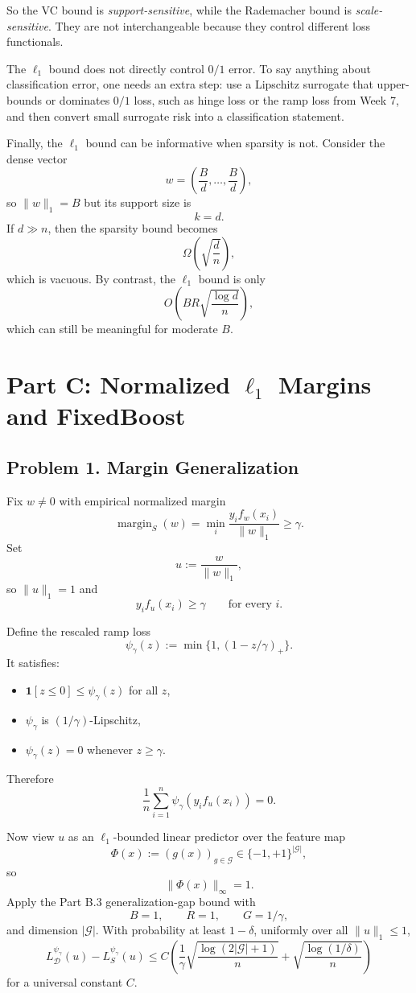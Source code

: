 \documentclass{article}
\newcommand{\cD}{\mathcal{D}}
\newcommand{\cG}{\mathcal{G}}
\newcommand{\one}{\mathbf{1}}
\begin{document}
So the VC bound is \emph{support-sensitive}, while the Rademacher bound is \emph{scale-sensitive}. They are not interchangeable because they control different loss functionals.

The $\ell_1$ bound does not directly control $0/1$ error. To say anything about classification error, one needs an extra step: use a Lipschitz surrogate that upper-bounds or dominates $0/1$ loss, such as hinge loss or the ramp loss from Week 7, and then convert small surrogate risk into a classification statement.

Finally, the $\ell_1$ bound can be informative when sparsity is not. Consider the dense vector
$$
w=\left(\frac{B}{d},\dots,\frac{B}{d}\right),
$$
so $\|w\|_1=B$ but its support size is
$$
k=d.
$$
If $d\gg n$, then the sparsity bound becomes
$$
\Omega\!\left(\sqrt{\frac{d}{n}}\right),
$$
which is vacuous. By contrast, the $\ell_1$ bound is only
$$
O\!\left(
BR\sqrt{\frac{\log d}{n}}
\right),
$$
which can still be meaningful for moderate $B$.

\newpage
\section{\texorpdfstring{Part C: Normalized $\ell_1$ Margins and FixedBoost}{Part C: Normalized l1 Margins and FixedBoost}}

\subsection{Problem 1. Margin Generalization}

Fix $w\neq 0$ with empirical normalized margin
$$
\operatorname{margin}_S(w)
=
\min_i \frac{y_i f_w(x_i)}{\|w\|_1}
\ge
\gamma.
$$
Set
$$
u:=\frac{w}{\|w\|_1},
$$
so $\|u\|_1=1$ and
$$
y_i f_u(x_i)\ge \gamma
\qquad
\text{for every }i.
$$

Define the rescaled ramp loss
$$
\psi_\gamma(z)
:=
\min\{1,(1-z/\gamma)_+\}.
$$
It satisfies:
\begin{itemize}
\item $\one[z\le 0]\le \psi_\gamma(z)$ for all $z$,
\item $\psi_\gamma$ is $(1/\gamma)$-Lipschitz,
\item $\psi_\gamma(z)=0$ whenever $z\ge \gamma$.
\end{itemize}
Therefore
$$
\frac1n\sum_{i=1}^n \psi_\gamma(y_i f_u(x_i))=0.
$$

Now view $u$ as an $\ell_1$-bounded linear predictor over the feature map
$$
\Phi(x):=(g(x))_{g\in\cG}\in\{-1,+1\}^{|\cG|},
$$
so
$$
\|\Phi(x)\|_\infty=1.
$$
Apply the Part B.3 generalization-gap bound with
$$
B=1,\qquad R=1,\qquad G=1/\gamma,
$$
and dimension $|\cG|$. With probability at least $1-\delta$, uniformly over all $\|u\|_1\le 1$,
$$
L_{\cD}^{\psi_\gamma}(u)-L_S^{\psi_\gamma}(u)
\le
C\left(
\frac{1}{\gamma}\sqrt{\frac{\log(2|\cG|+1)}{n}}
+
\sqrt{\frac{\log(1/\delta)}{n}}
\right)
$$
for a universal constant $C$.
\end{document}
